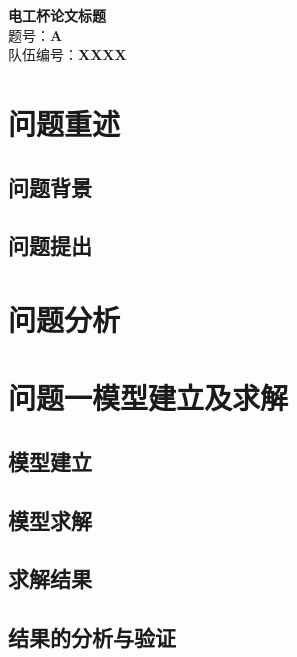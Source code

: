 \documentclass[12pt,a4paper]{ctexart}
\newcommand{\ProblemCode}{A}
\newcommand{\TeamNumber}{XXXX}
\newcommand{\PaperTitle}{电工杯论文标题}
\begin{document}
\begin{titlepage}
\begin{center}
\vspace*{2cm}
{\Huge\bfseries \PaperTitle}\\[2cm]
{\Large 题号：\textbf{\ProblemCode}}\\[1cm]
{\Large 队伍编号：\textbf{\TeamNumber}}\\[3cm]
\end{center}
\end{titlepage}

\section{问题重述}
\subsection{问题背景}
\subsection{问题提出}

\section{问题分析}

\section{问题一模型建立及求解}
\subsection{模型建立}
\subsection{模型求解}
\subsection{求解结果}
\subsection{结果的分析与验证}
\end{document}
